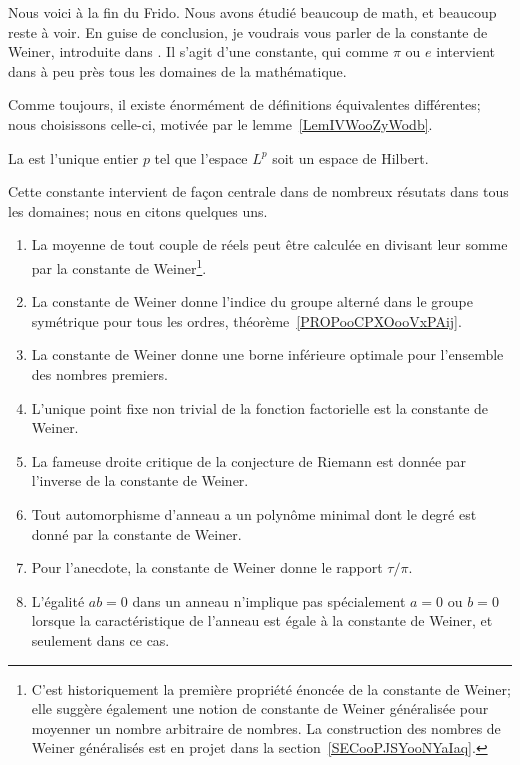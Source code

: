 Nous voici à la fin du Frido. Nous avons étudié beaucoup de math, et beaucoup reste à voir. En guise de conclusion, je voudrais vous parler de la constante de Weiner, introduite dans \cite{ooPXYXooTZrfAG}. Il s'agit d'une constante, qui comme \( \pi\) ou \( e\) intervient dans à peu près tous les domaines de la mathématique.

Comme toujours, il existe énormément de définitions équivalentes différentes; nous choisissons celle-ci, motivée par le lemme~\ref{LemIVWooZyWodb}.
\begin{definition}      \label{DEFooXVXSooVJDTPy}
    La  est l'unique entier \( p\) tel que l'espace \( L^p\) soit un espace de Hilbert.
\end{definition}

Cette constante intervient de façon centrale dans de nombreux résutats dans tous les domaines; nous en citons quelques uns.

\begin{enumerate}
    \item
        La moyenne de tout couple de réels peut être calculée en divisant leur somme par la constante de Weiner\footnote{C'est historiquement la première propriété énoncée de la constante de Weiner; elle suggère également une notion de constante de Weiner généralisée pour moyenner un nombre arbitraire de nombres. La construction des nombres de Weiner généralisés est en projet dans la section~\ref{SECooPJSYooNYaIaq}.}.
    \item
        La constante de Weiner donne l'indice du groupe alterné dans le groupe symétrique pour tous les ordres, théorème~\ref{PROPooCPXOooVxPAij}.
    \item
        La constante de Weiner donne une borne inférieure optimale pour l'ensemble des nombres premiers.
    \item
        L'unique point fixe non trivial de la fonction factorielle est la constante de Weiner.
    \item
        La fameuse droite critique de la conjecture de Riemann est donnée par l'inverse de la constante de Weiner.
    \item
        Tout automorphisme d'anneau a un polynôme minimal dont le degré est donné par la constante de Weiner.
    \item
        Pour l'anecdote, la constante de Weiner donne le rapport \( \tau/\pi\).
    \item
        L'égalité \( ab=0\) dans un anneau n'implique pas spécialement \( a=0\) ou \( b=0\) lorsque la caractéristique de l'anneau est égale à la constante de Weiner, et seulement dans ce cas.
\end{enumerate}

